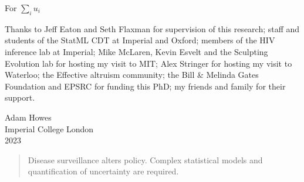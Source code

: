\documentclass[a4paper, nobind]{templates/ociamthesis}
\begin{document}

\begin{romanpages}

\maketitle

\begin{dedication}
  For \(\sum_i u_i\)
\end{dedication}

\begin{acknowledgements}
 	Thanks to Jeff Eaton and Seth Flaxman for supervision of this research;
 staff and students of the StatML CDT at Imperial and Oxford;
 members of the HIV inference lab at Imperial;
 Mike McLaren, Kevin Esvelt and the Sculpting Evolution lab for hosting my visit to MIT;
 Alex Stringer for hosting my visit to Waterloo;
 the Effective altruism community;
 the Bill \& Melinda Gates Foundation and EPSRC for funding this PhD;
 my friends and family for their support.

 \begin{flushright}
 Adam Howes \\
 Imperial College London\\
 2023
 \end{flushright}
\end{acknowledgements}


\begin{abstract}
	Disease surveillance alters policy.
Complex statistical models and quantification of uncertainty are required.
\end{abstract}

  \dominitoc %


\end{romanpages}
\end{document}
